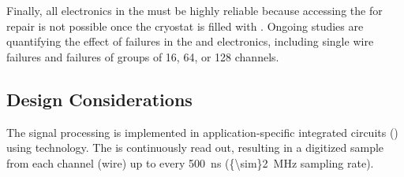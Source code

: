 Finally, all electronics in the  must
be highly reliable because accessing the  for repair is not possible once the cryostat is filled with . Ongoing studies are quantifying the effect of failures in the  and electronics, including single wire failures and failures of groups of \num{16}, \num{64}, or \num{128} channels.






\subsection{Design Considerations}
\label{sec:fdsp-tpcelec-overview-design}

The  signal processing is implemented in application-specific integrated circuits ()
using  technology.  The  is continuously read out, resulting in a digitized 
sample from each  channel (wire) up to every \SI{500}{ns} (\SI{{\sim}2}{MHz} sampling rate).

